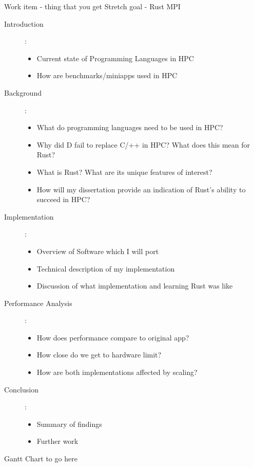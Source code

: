 \documentclass{article}[a4]
\begin{document}
Work item - thing that you get
Stretch goal - Rust MPI
\begin{description}
  \item[Introduction]:
  \begin{itemize}
    \item Current state of Programming Languages in HPC
    \item How are benchmarks/miniapps used in HPC
  \end{itemize}
  \item[Background]:
    \begin{itemize}
    \item What do programming languages need to be used in HPC?
    \item Why did D fail to replace C/++ in HPC? What does this mean for Rust?
    \item What is Rust? What are its unique features of interest?
    \item How will my dissertation provide an indication of Rust's ability to succeed in HPC?
  \end{itemize}
  \item[Implementation]:
  \begin{itemize}
    \item Overview of Software which I will port
    \item Technical description of my implementation
    \item Discussion of what implementation and learning Rust was like
  \end{itemize}
  \item[Performance Analysis]:
  \begin{itemize}
    \item How does performance compare to original app?
    \item How close do we get to hardware limit?
    \item How are both implementations affected by scaling?
  \end{itemize}
  \item[Conclusion] :
  \begin{itemize}
    \item Summary of findings
    \item Further work
  \end{itemize}
\end{description}

Gantt Chart to go here
\end{document}
